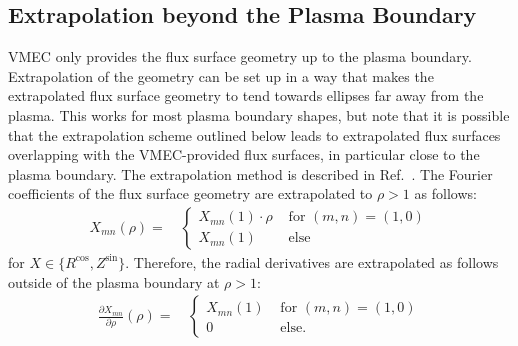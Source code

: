 \FloatBarrier
\subsection{Extrapolation beyond the Plasma Boundary}
%
VMEC only provides the flux surface geometry up to the plasma boundary.
%
Extrapolation of the geometry can be set up in a way that makes
the extrapolated flux surface geometry to tend towards ellipses far away from the plasma.
%
This works for most plasma boundary shapes, but note that it is possible
that the extrapolation scheme outlined below leads to extrapolated flux surfaces overlapping
with the VMEC-provided flux surfaces, in particular close to the plasma boundary.
%
The extrapolation method is described in Ref.~\cite{attenberger_1987}.
%
The Fourier coefficients of the flux surface geometry are extrapolated
to $\rho > 1$ as follows:
\begin{align}
 X_{mn}(\rho) =&\, \begin{cases}
                    X_{mn}(1)          \cdot \rho  & \textrm{ for } (m,n)=(1,0) \\
                    X_{mn}(1) \phantom{\cdot \rho} & \textrm{ else }
                   \end{cases}
\end{align}
for $X \in \{ R^\textrm{cos}, Z^\textrm{sin} \}$.
%
Therefore, the radial derivatives are extrapolated as follows
outside of the plasma boundary at $\rho > 1$:
\begin{align}
 \frac{\partial X_{mn}}{\partial \rho}(\rho) =&\, \begin{cases}
                                                   X_{mn}(1) & \textrm{ for } (m,n)=(1,0) \\
                                                   0         & \textrm{ else. }
                                                  \end{cases}
\end{align}

\FloatBarrier
